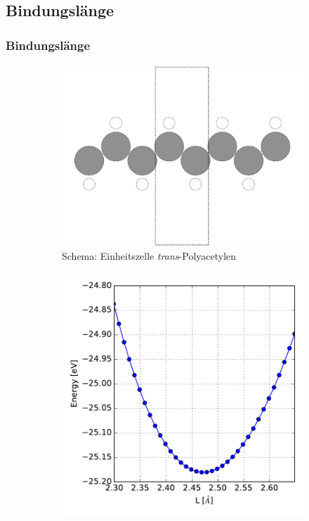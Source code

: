 \subsection{Bindungslänge}
\begin{frame}
\frametitle{Bindungslänge}

\begin{figure}[]
	\centering
	\vspace*{-.43cm}
	\begin{subfigure}{0.4\textwidth}
		\vspace*{1.15cm}
		\includegraphics[width = \textwidth]{Images/polyacetylene/convergence/polyacetylene_nice_unit_cell}
		\captionsetup{justification = centering}
		\caption{Schema: Einheitszelle \emph{trans}-Polyacetylen}
	\end{subfigure}\hspace*{1cm}
	\begin{subfigure}{0.45\textwidth}
		\centering
		\includegraphics[width = \textwidth]{Images/polyacetylene/convergence/unit_cell_length}

\end{subfigure}
\end{figure}
\end{frame}
